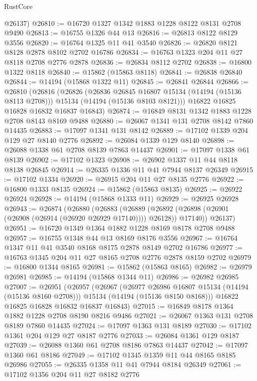 \begin{lexlean}{RustCore}
\begin{coremodule}
      @26137)
@26810 := @16720 @1327 @1342 @1883 @1228 @8122 @8131 @2708 @9490
@26813 := @16755 @1326 @44 @13
@26816 := @26813 @8122 @8129 @3556
@26820 := @16764 @1325 @11 @41 @3540
@26826 := @26820 @8121 @8128 @2878 @8102 @2702 @16786
@26834 := @16763 @1323 @204 @11 @27 @8118 @2708 @2776 @2878
@26836 := @26834 @8112 @2702
@26838 := @16800 @1322 @8118
@26840 := @15862 (@15863 @8118)
@26841 := @26838 @26840
@26844 := @14194 (@15868 @1322 @11)
@26845 := @26841 @26844
@26866 := @26810
    (@26816
      (@26826
        (@26836 @26845 @16807 @15134 (@14194 (@15136 @8113 @2708)))
        @15134
        (@14194 (@15136 @8103 @8121)))
      @16822
      @16825
      @16828
      @16832
      @16837
      @16843)
@26874 := @16849 @8131 @1342 @1883 @1228 @2708 @8143 @8169 @9488
@26880 := @26067 @1341 @131 @2708 @8142 @7860 @14435
@26883 := @17097 @1341 @131 @8142
@26889 := @17102 @1339 @204 @129 @27 @8140 @2776
@26892 := @26084 @1339 @129 @8140
@26898 := @26088 @1338 @61 @2708 @8139 @7863 @14437
@26901 := @17097 @1338 @61 @8139
@26902 := @17102 @1323
@26908 := @26902 @1337 @11 @44 @8118 @8138 @26845
@26914 := @26335 @1336 @11 @41 @7944 @8137 @26349
@26915 := @17102 @1334
@26920 := @26915 @204 @11 @27 @8135 @2776
@26922 := @16800 @1333 @8135
@26924 := @15862 (@15863 @8135)
@26925 := @26922 @26924
@26928 := @14194 (@15868 @1333 @11)
@26929 := @26925 @26928
@26943 := @26874
    (@26880
      (@26883
        (@26889 (@26892 (@26898 (@26901 (@26908 (@26914 (@26920 @26929 @17140)))) @26128)) @17140))
      @26137)
@26951 := @16720 @1349 @1364 @1882 @1228 @8169 @8178 @2708 @9488
@26957 := @16755 @1348 @44 @13 @8169 @8176 @3556
@26967 := @16764 @1347 @11 @41 @3540 @8168 @8175 @2878 @8149 @2702 @16786
@26977 := @16763 @1345 @204 @11 @27 @8165 @2708 @2776 @2878 @8159 @2702
@26979 := @16800 @1344 @8165
@26981 := @15862 (@15863 @8165)
@26982 := @26979 @26981
@26985 := @14194 (@15868 @1344 @11)
@26986 := @26982 @26985
@27007 := @26951
    (@26957
      (@26967
        (@26977 @26986 @16807 @15134 (@14194 (@15136 @8160 @2708)))
        @15134
        (@14194 (@15136 @8150 @8168)))
      @16822
      @16825
      @16828
      @16832
      @16837
      @16843)
@27015 := @16849 @8178 @1364 @1882 @1228 @2708 @8190 @8216 @9486
@27021 := @26067 @1363 @131 @2708 @8189 @7860 @14435
@27024 := @17097 @1363 @131 @8189
@27030 := @17102 @1361 @204 @129 @27 @8187 @2776
@27033 := @26084 @1361 @129 @8187
@27039 := @26088 @1360 @61 @2708 @8186 @7863 @14437
@27042 := @17097 @1360 @61 @8186
@27049 := @17102 @1345 @1359 @11 @44 @8165 @8185 @26986
@27055 := @26335 @1358 @11 @41 @7944 @8184 @26349
@27061 := @17102 @1356 @204 @11 @27 @8182 @2776

\end{coremodule}
\end{lexlean}
